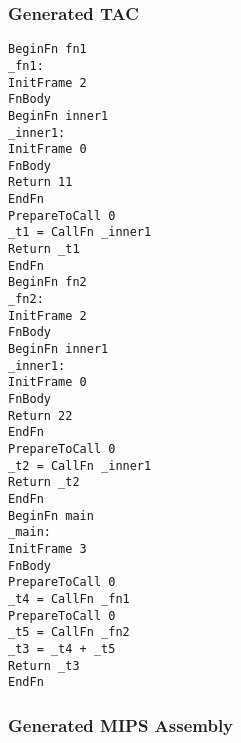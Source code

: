\subsubsection{Generated TAC}
\begin{lstlisting}[showstringspaces=false,breaklines=true,backgroundcolor=\color{light-gray}, captionpos=b]
BeginFn fn1
_fn1:
InitFrame 2
FnBody
BeginFn inner1
_inner1:
InitFrame 0
FnBody
Return 11
EndFn
PrepareToCall 0
_t1 = CallFn _inner1
Return _t1
EndFn
BeginFn fn2
_fn2:
InitFrame 2
FnBody
BeginFn inner1
_inner1:
InitFrame 0
FnBody
Return 22
EndFn
PrepareToCall 0
_t2 = CallFn _inner1
Return _t2
EndFn
BeginFn main
_main:
InitFrame 3
FnBody
PrepareToCall 0
_t4 = CallFn _fn1
PrepareToCall 0
_t5 = CallFn _fn2
_t3 = _t4 + _t5
Return _t3
EndFn

\end{lstlisting}\subsubsection{Generated MIPS Assembly}

